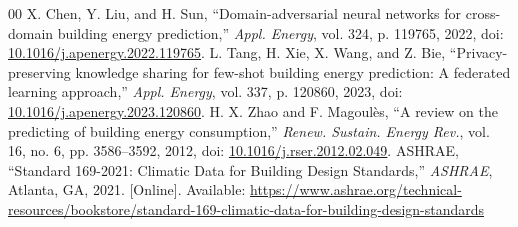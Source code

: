 \documentclass[conference]{IEEEtran}
\begin{document}
\begin{thebibliography}{00}
 X. Chen, Y. Liu, and H. Sun, ``Domain-adversarial neural networks for cross-domain building energy prediction,'' \textit{Appl. Energy}, vol. 324, p. 119765, 2022, doi: \href{https://doi.org/10.1016/j.apenergy.2022.119765}{10.1016/j.apenergy.2022.119765}.
 L. Tang, H. Xie, X. Wang, and Z. Bie, ``Privacy-preserving knowledge sharing for few-shot building energy prediction: A federated learning approach,'' \textit{Appl. Energy}, vol. 337, p. 120860, 2023, doi: \href{https://doi.org/10.1016/j.apenergy.2023.120860}{10.1016/j.apenergy.2023.120860}.
 H. X. Zhao and F. Magoul\`es, ``A review on the predicting of building energy consumption,'' \textit{Renew. Sustain. Energy Rev.}, vol. 16, no. 6, pp. 3586--3592, 2012, doi: \href{https://doi.org/10.1016/j.rser.2012.02.049}{10.1016/j.rser.2012.02.049}.
 ASHRAE, ``Standard 169-2021: Climatic Data for Building Design Standards,'' \textit{ASHRAE}, Atlanta, GA, 2021. [Online]. Available: \url{https://www.ashrae.org/technical-resources/bookstore/standard-169-climatic-data-for-building-design-standards}
\end{thebibliography}
\end{document}
